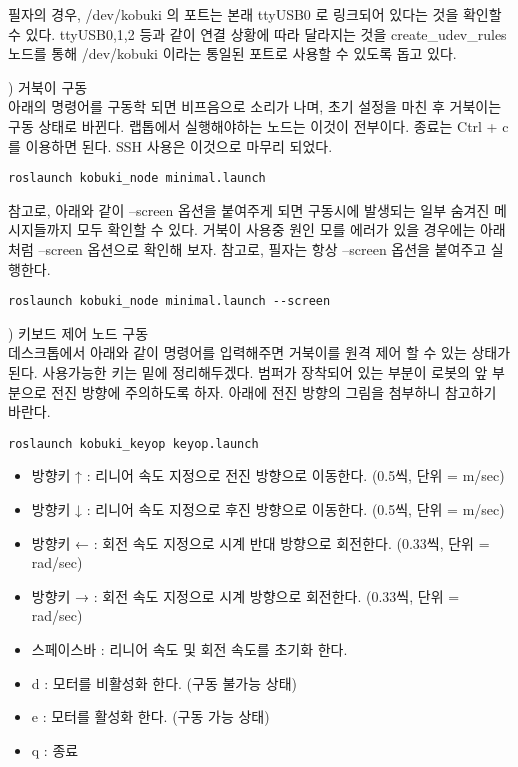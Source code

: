 필자의 경우, /dev/kobuki 의 포트는 본래 ttyUSB0 로 링크되어 있다는 것을 확인할 수 있다. ttyUSB0,1,2 등과 같이 연결 상황에 따라 달라지는 것을 create\_udev\_rules 노드를 통해 /dev/kobuki 이라는 통일된 포트로 사용할 수 있도록 돕고 있다.

\vspace{\baselineskip}
\noindent{}
\thenum) 거북이 구동\\
아래의 명령어를 구동학 되면 비프음으로 소리가 나며, 초기 설정을 마친 후 거북이는 구동 상태로 바뀐다. 랩톱에서 실행해야하는 노드는 이것이 전부이다. 종료는 Ctrl + c 를 이용하면 된다. SSH 사용은 이것으로 마무리 되었다.

\begin{lstlisting}[language=ROS]
roslaunch kobuki_node minimal.launch
\end{lstlisting}

\vspace{\baselineskip}
\noindent
참고로, 아래와 같이 --screen 옵션을 붙여주게 되면 구동시에 발생되는 일부 숨겨진 메시지들까지 모두 확인할 수 있다. 거북이 사용중 원인 모를 에러가 있을 경우에는 아래처럼 --screen 옵션으로 확인해 보자. 참고로, 필자는 항상 --screen 옵션을 붙여주고 실행한다.

\begin{lstlisting}[language=ROS]
roslaunch kobuki_node minimal.launch --screen 
\end{lstlisting}

\vspace{\baselineskip}
\noindent{}
\thenum) 키보드 제어 노드 구동\\
데스크톱에서 아래와 같이 명령어를 입력해주면 거북이를 원격 제어 할 수 있는 상태가 된다. 사용가능한 키는 밑에 정리해두겠다. 범퍼가 장착되어 있는 부분이 로봇의 앞 부분으로 전진 방향에 주의하도록 하자. 아래에 전진 방향의 그림을 첨부하니 참고하기 바란다.

\begin{lstlisting}[language=ROS]
roslaunch kobuki_keyop keyop.launch
\end{lstlisting}

\begin{itemize}[leftmargin=*]
\item 방향키 ↑ : 리니어 속도 지정으로 전진 방향으로 이동한다. (0.5씩, 단위 = m/sec) 
\item 방향키 ↓ : 리니어 속도 지정으로 후진 방향으로 이동한다. (0.5씩, 단위 = m/sec) 
\item 방향키 ← : 회전 속도 지정으로 시계 반대 방향으로 회전한다. (0.33씩, 단위 = rad/sec) 
\item 방향키 → : 회전 속도 지정으로 시계 방향으로 회전한다. (0.33씩, 단위 = rad/sec) 
\item 스페이스바 : 리니어 속도 및 회전 속도를 초기화 한다.
\item d : 모터를 비활성화 한다. (구동 불가능 상태)
\item e : 모터를 활성화 한다. (구동 가능 상태)
\item q : 종료
\end{itemize}

